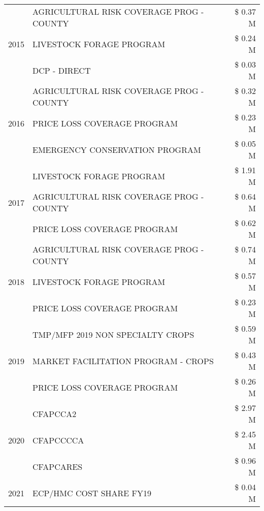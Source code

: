 \begin{tabular}{llr}
\cline{1-3}
\multirow[t]{3}{*}{2015} & AGRICULTURAL RISK COVERAGE PROG - COUNTY & \$ 0.37 M \\
 & LIVESTOCK FORAGE PROGRAM & \$ 0.24 M \\
 & DCP - DIRECT & \$ 0.03 M \\
\cline{1-3}
\multirow[t]{3}{*}{2016} & AGRICULTURAL RISK COVERAGE PROG - COUNTY & \$ 0.32 M \\
 & PRICE LOSS COVERAGE PROGRAM & \$ 0.23 M \\
 & EMERGENCY CONSERVATION PROGRAM & \$ 0.05 M \\
\cline{1-3}
\multirow[t]{3}{*}{2017} & LIVESTOCK FORAGE PROGRAM & \$ 1.91 M \\
 & AGRICULTURAL RISK COVERAGE PROG - COUNTY & \$ 0.64 M \\
 & PRICE LOSS COVERAGE PROGRAM & \$ 0.62 M \\
\cline{1-3}
\multirow[t]{3}{*}{2018} & AGRICULTURAL RISK COVERAGE PROG - COUNTY & \$ 0.74 M \\
 & LIVESTOCK FORAGE PROGRAM & \$ 0.57 M \\
 & PRICE LOSS COVERAGE PROGRAM & \$ 0.23 M \\
\cline{1-3}
\multirow[t]{3}{*}{2019} & TMP/MFP 2019 NON SPECIALTY CROPS & \$ 0.59 M \\
 & MARKET FACILITATION PROGRAM - CROPS & \$ 0.43 M \\
 & PRICE LOSS COVERAGE PROGRAM & \$ 0.26 M \\
\cline{1-3}
\multirow[t]{3}{*}{2020} & CFAPCCA2 & \$ 2.97 M \\
 & CFAPCCCCA & \$ 2.45 M \\
 & CFAPCARES & \$ 0.96 M \\
\cline{1-3}
2021 & ECP/HMC COST SHARE FY19 & \$ 0.04 M \\
\cline{1-3}
\bottomrule
\end{tabular}
